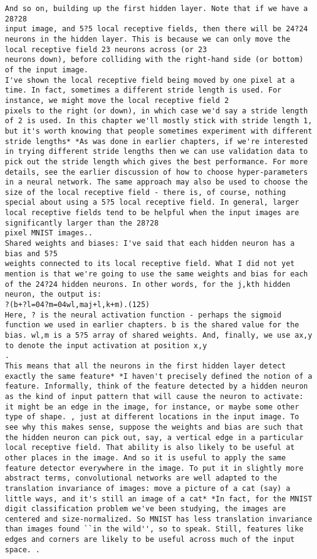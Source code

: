 \begin{lstlisting}
And so on, building up the first hidden layer. Note that if we have a 28?28
input image, and 5?5 local receptive fields, then there will be 24?24 neurons in the hidden layer. This is because we can only move the local receptive field 23 neurons across (or 23
neurons down), before colliding with the right-hand side (or bottom) of the input image.
I've shown the local receptive field being moved by one pixel at a time. In fact, sometimes a different stride length is used. For instance, we might move the local receptive field 2
pixels to the right (or down), in which case we'd say a stride length of 2 is used. In this chapter we'll mostly stick with stride length 1, but it's worth knowing that people sometimes experiment with different stride lengths* *As was done in earlier chapters, if we're interested in trying different stride lengths then we can use validation data to pick out the stride length which gives the best performance. For more details, see the earlier discussion of how to choose hyper-parameters in a neural network. The same approach may also be used to choose the size of the local receptive field - there is, of course, nothing special about using a 5?5 local receptive field. In general, larger local receptive fields tend to be helpful when the input images are significantly larger than the 28?28
pixel MNIST images..
Shared weights and biases: I've said that each hidden neuron has a bias and 5?5
weights connected to its local receptive field. What I did not yet mention is that we're going to use the same weights and bias for each of the 24?24 hidden neurons. In other words, for the j,kth hidden neuron, the output is: 
?(b+?l=04?m=04wl,maj+l,k+m).(125)
Here, ? is the neural activation function - perhaps the sigmoid function we used in earlier chapters. b is the shared value for the bias. wl,m is a 5?5 array of shared weights. And, finally, we use ax,y to denote the input activation at position x,y
.
This means that all the neurons in the first hidden layer detect exactly the same feature* *I haven't precisely defined the notion of a feature. Informally, think of the feature detected by a hidden neuron as the kind of input pattern that will cause the neuron to activate: it might be an edge in the image, for instance, or maybe some other type of shape. , just at different locations in the input image. To see why this makes sense, suppose the weights and bias are such that the hidden neuron can pick out, say, a vertical edge in a particular local receptive field. That ability is also likely to be useful at other places in the image. And so it is useful to apply the same feature detector everywhere in the image. To put it in slightly more abstract terms, convolutional networks are well adapted to the translation invariance of images: move a picture of a cat (say) a little ways, and it's still an image of a cat* *In fact, for the MNIST digit classification problem we've been studying, the images are centered and size-normalized. So MNIST has less translation invariance than images found ``in the wild'', so to speak. Still, features like edges and corners are likely to be useful across much of the input space. .

\end{lstlisting}
